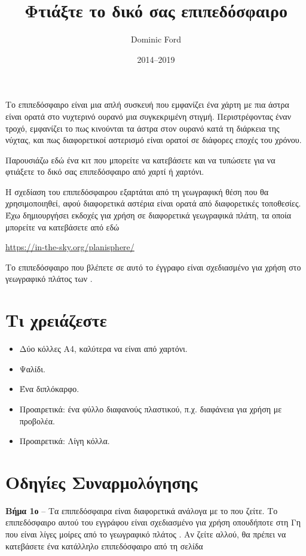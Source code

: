 \documentclass[a4paper,onecolumn,10pt]{article}
\title{Φτιάξτε το δικό σας επιπεδόσφαιρο}
\author{Dominic Ford}
\date{2014--2019}
\begin{document}
\maketitle
\setcounter{footnote}{1}

Το επιπεδόσφαιρο είναι μια απλή συσκευή που εμφανίζει ένα χάρτη με πια άστρα είναι
ορατά στο νυχτερινό ουρανό μια συγκεκριμένη στιγμή. Περιστρέφοντας έναν τροχό, εμφανίζει
το πως κινούνται τα άστρα στον ουρανό κατά τη διάρκεια της νύχτας, και πως διαφορετικοί 
αστερισμό είναι ορατοί σε διάφορες εποχές του χρόνου.

Παρουσιάζω εδώ ένα κιτ που μπορείτε να κατεβάσετε και να τυπώσετε για να φτιάξετε το δικό σας
επιπεδόσφαιρο από χαρτί ή χαρτόνι.

Η σχεδίαση του επιπεδόσφαιρου εξαρτάται από τη γεωγραφική θέση που θα χρησιμοποιηθεί, αφού 
διαφορετικά αστέρια είναι ορατά από διαφορετικές τοποθεσίες. Έχω δημιουργήσει εκδοχές 
για χρήση σε διαφορετικά γεωγραφικά πλάτη, τα οποία μπορείτε να κατεβάσετε από εδώ

\url{https://in-the-sky.org/planisphere/}

Το επιπεδόσφαιρο που βλέπετε σε αυτό το έγγραφο είναι σχεδιασμένο για χρήση στο γεωγραφικό πλάτος των 
.
 
\section*{Τι χρειάζεστε}

\begin{itemize}
\item Δύο κόλλες A4, καλύτερα να είναι από χαρτόνι.
\item Ψαλίδι.
\item Ένα διπλόκαρφο.
\item Προαιρετικά: ένα φύλλο διαφανούς πλαστικού, π.χ. διαφάνεια για χρήση με προβολέα.
\item Προαιρετικά: Λίγη κόλλα.
\end{itemize}

\section*{Οδηγίες Συναρμολόγησης}

{\bf Βήμα 1ο} -- Τα επιπεδόσφαιρα είναι διαφορετικά ανάλογα με το που ζείτε. 
Το επιπεδόσφαιρο αυτού του εγγράφου είναι σχεδιασμένο για χρήση οπουδήποτε στη Γη
που είναι λίγες μοίρες από το γεωγραφικό πλάτος . Αν ζείτε αλλού,
θα πρέπει να κατεβάσετε ένα κατάλληλο επιπεδόσφαιρο από τη σελίδα 
\end{document}
